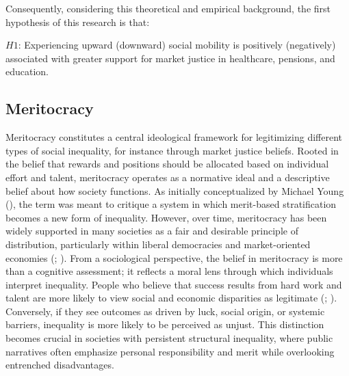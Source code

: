 \documentclass[
  13pt,
]{article}
\begin{document}
Consequently, considering this theoretical and empirical background, the
first hypothesis of this research is that:

\(H1\): Experiencing upward (downward) social mobility is positively
(negatively) associated with greater support for market justice in
healthcare, pensions, and education.

\subsection{Meritocracy}\label{meritocracy}

Meritocracy constitutes a central ideological framework for legitimizing
different types of social inequality, for instance through market
justice beliefs. Rooted in the belief that rewards and positions should
be allocated based on individual effort and talent, meritocracy operates
as a normative ideal and a descriptive belief about how society
functions. As initially conceptualized by Michael Young
(), the term was meant to critique a
system in which merit-based stratification becomes a new form of
inequality. However, over time, meritocracy has been widely supported in
many societies as a fair and desirable principle of distribution,
particularly within liberal democracies and market-oriented economies
(;
). From a sociological
perspective, the belief in meritocracy is more than a cognitive
assessment; it reflects a moral lens through which individuals interpret
inequality. People who believe that success results from hard work and
talent are more likely to view social and economic disparities as
legitimate (;
).
Conversely, if they see outcomes as driven by luck, social origin, or
systemic barriers, inequality is more likely to be perceived as unjust.
This distinction becomes crucial in societies with persistent structural
inequality, where public narratives often emphasize personal
responsibility and merit while overlooking entrenched disadvantages.
\end{document}
